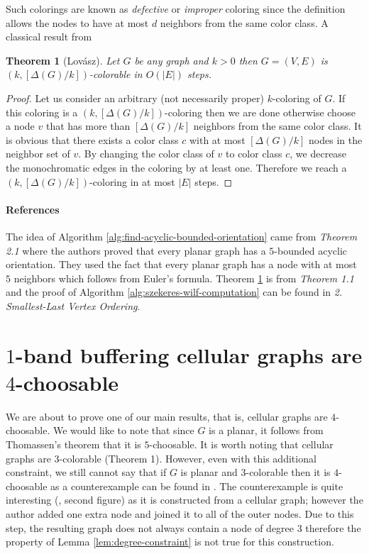 \documentclass[a4paper, 12pt]{article}
\newtheorem{theo}[lem]{Theorem}
\begin{document}
Such colorings are known as \textit{defective} or \textit{improper} coloring since the definition allows the nodes to have at most $d$ neighbors from the same color class.
A classical result from 
\begin{theo}[Lovász]\label{theo:lovasz-defective}
Let $G$ be any graph and $k > 0$ then $G=(V,E)$ is $(k,[\Delta(G)/k])$-colorable in $O(|E|)$ steps.
\end{theo}
\begin{proof} Let us consider an arbitrary (not necessarily proper) $k$-coloring of $G$. If this coloring is a $(k,[\Delta(G)/k])$-coloring then we are done otherwise choose a node $v$ that has more than $[\Delta(G)/k]$ neighbors from the same color class. It is obvious that there exists a color class $c$ with at most $[\Delta(G)/k]$ nodes in the neighbor set of $v$. By changing the color class of $v$ to color class $c$, we decrease the monochromatic edges in the coloring by at least one. Therefore we reach a $(k,[\Delta(G)/k])$-coloring in at most $|E|$ steps.
\end{proof}

\paragraph*{References} The idea of Algorithm \ref{alg:find-acyclic-bounded-orientation} came from \cite{CHROBAK1991243} \textit{Theorem 2.1} where the authors proved that every planar graph has a $5$-bounded acyclic orientation. They used the fact that every planar graph has a node with at most $5$ neighbors which follows from Euler's formula. Theorem \ref{theo:lovasz-defective} is from \cite{Cowen:1997:CD:314161.314387} \textit{Theorem 1.1} and the proof of Algorithm \ref{alg:szekeres-wilf-computation} can be found in \cite{Matula:1983:SOC:2402.322385} \textit{2. Smallest-Last Vertex Ordering}.

\section{$1$-band buffering cellular graphs are $4$-choosable}\label{sec:4-choosable}

We are about to prove one of our main results, that is, cellular graphs are $4$-choosable. We would like to note that since $G$ is a planar, it follows from Thomassen's theorem \cite{Thomassen:1994:PG:184180.184192} that it is $5$-choosable. It is worth noting that cellular graphs are $3$-colorable \cite{662943} (Theorem 1). However, even with this additional constraint, we still cannot say that if $G$ is planar and $3$-colorable then it is $4$-choosable as a counterexample can be found in \cite{JGT:JGT4}. The counterexample is quite interesting (\cite {JGT:JGT4}, second figure) as it is constructed from a cellular graph; however the author added one extra node and joined it to all of the outer nodes. Due to this step, the resulting graph does not always contain a node of degree $3$ therefore the property of Lemma \ref{lem:degree-constraint} is not true for this construction.
\end{document}
